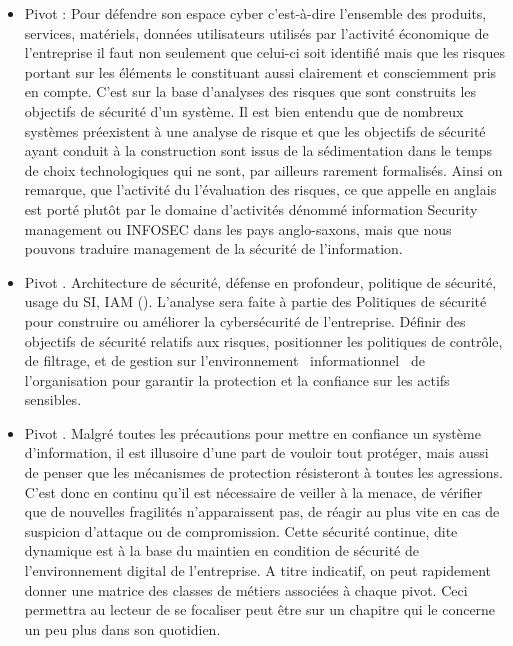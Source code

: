 \begin{itemize}
\item Pivot  : Pour défendre son espace cyber  c'est-à-dire l'ensemble des produits, services, matériels, données utilisateurs utilisés par l'activité  économique de l'entreprise il faut non seulement que celui-ci soit identifié mais que les risques portant sur les éléments le constituant     aussi clairement et consciemment pris en compte. C'est sur la base d'analyses des risques que sont construits les objectifs de sécurité d'un système. Il est bien entendu que de nombreux systèmes préexistent à une analyse de risque et que les objectifs de sécurité ayant conduit à la construction sont issus de  la sédimentation dans le temps de choix technologiques qui ne sont, par ailleurs rarement formalisés. Ainsi on remarque, que l'activité du l'évaluation des risques, ce que appelle en anglais  est porté plutôt par le domaine d'activités dénommé  information Security management  ou INFOSEC dans les pays anglo-saxons, mais que nous pouvons traduire  management de la sécurité de l'information.
\item Pivot  . Architecture de sécurité, défense en profondeur, politique de sécurité, usage du SI, IAM (). L'analyse sera faite à partie des Politiques de sécurité pour construire ou améliorer la cybersécurité de l'entreprise. Définir des objectifs de sécurité relatifs aux risques,  positionner les politiques de contrôle, de filtrage, et de gestion sur l'environnement  informationnel  de  l'organisation pour garantir la protection et la confiance sur les actifs sensibles. 
\item  Pivot  . Malgré toutes les précautions pour mettre en confiance un système d'information, il est illusoire d'une part de vouloir tout protéger, mais aussi de penser que les mécanismes de  protection résisteront à toutes les agressions. C'est donc en continu qu'il est nécessaire de veiller à la menace, de vérifier que de nouvelles fragilités n'apparaissent pas, de réagir au plus vite en cas de suspicion d'attaque ou de compromission.  Cette sécurité continue, dite dynamique est à la base du maintien en condition de sécurité de l'environnement digital de l'entreprise. 
A titre indicatif, on peut rapidement donner une matrice des classes de métiers associées à chaque pivot. Ceci permettra au lecteur de se focaliser peut être sur un chapitre qui le concerne un peu plus dans son quotidien.
\end{itemize}

